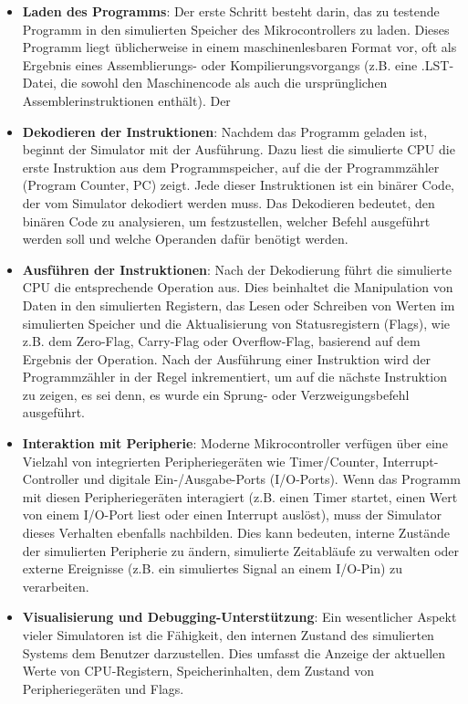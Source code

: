 \begin{itemize}
    \item \textbf{Laden des Programms}: Der erste Schritt besteht darin, das zu testende Programm in den simulierten Speicher des Mikrocontrollers zu laden. Dieses Programm liegt üblicherweise in einem maschinenlesbaren Format vor, oft als Ergebnis eines Assemblierungs- oder Kompilierungsvorgangs (z.B. eine .LST-Datei, die sowohl den Maschinencode als auch die ursprünglichen Assemblerinstruktionen enthält). Der 
    \item \textbf{Dekodieren der Instruktionen}: Nachdem das Programm geladen ist, beginnt der Simulator mit der Ausführung. Dazu liest die simulierte CPU die erste Instruktion aus dem Programmspeicher, auf die der Programmzähler (Program Counter, PC) zeigt. Jede dieser Instruktionen ist ein binärer Code, der vom Simulator dekodiert werden muss. Das Dekodieren bedeutet, den binären Code zu analysieren, um festzustellen, welcher Befehl ausgeführt werden soll und welche Operanden dafür benötigt werden.
    \item \textbf{Ausführen der Instruktionen}: Nach der Dekodierung führt die simulierte CPU die entsprechende Operation aus. Dies beinhaltet die Manipulation von Daten in den simulierten Registern, das Lesen oder Schreiben von Werten im simulierten Speicher und die Aktualisierung von Statusregistern (Flags), wie z.B. dem Zero-Flag, Carry-Flag oder Overflow-Flag, basierend auf dem Ergebnis der Operation. Nach der Ausführung einer Instruktion wird der Programmzähler in der Regel inkrementiert, um auf die nächste Instruktion zu zeigen, es sei denn, es wurde ein Sprung- oder Verzweigungsbefehl ausgeführt.
    \item \textbf{Interaktion mit Peripherie}: Moderne Mikrocontroller verfügen über eine Vielzahl von integrierten Peripheriegeräten wie Timer/Counter, Interrupt-Controller und digitale Ein-/Ausgabe-Ports (I/O-Ports). Wenn das Programm mit diesen Peripheriegeräten interagiert (z.B. einen Timer startet, einen Wert von einem I/O-Port liest oder einen Interrupt auslöst), muss der Simulator dieses Verhalten ebenfalls nachbilden. Dies kann bedeuten, interne Zustände der simulierten Peripherie zu ändern, simulierte Zeitabläufe zu verwalten oder externe Ereignisse (z.B. ein simuliertes Signal an einem I/O-Pin) zu verarbeiten.
    \item \textbf{Visualisierung und Debugging-Unterstützung}: Ein wesentlicher Aspekt vieler Simulatoren ist die Fähigkeit, den internen Zustand des simulierten Systems dem Benutzer darzustellen. Dies umfasst die Anzeige der aktuellen Werte von CPU-Registern, Speicherinhalten, dem Zustand von Peripheriegeräten und Flags.
\end{itemize}

